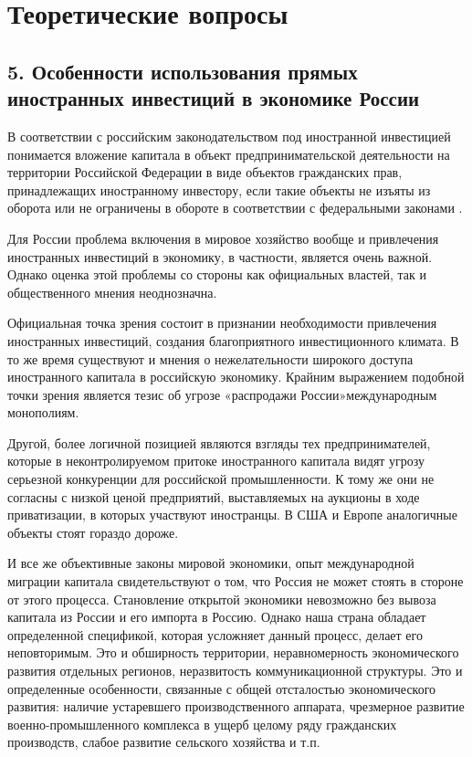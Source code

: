 \section{Теоретические вопросы}
\subsection*{5. Особенности использования прямых иностранных инвестиций в экономике России}

В соответствии с российским законодательством под иностранной инвестицией понимается вложение капитала в объект предпринимательской деятельности на территории Российской Федерации в виде объектов гражданских прав, принадлежащих иностранному инвестору, если такие объекты не изъяты из оборота или не ограничены в обороте в соответствии с федеральными законами .

Для России проблема включения в мировое хозяйство вообще и привлечения иностранных инвестиций в экономику, в частности, является очень важной. Однако оценка этой проблемы со стороны как официальных властей, так и общественного мнения неоднозначна.

Официальная точка зрения состоит в признании необходимости привлечения иностранных инвестиций, создания благоприятного инвестиционного климата. В то же время существуют и мнения о нежелательности широкого доступа иностранного капитала в российскую экономику. Крайним выражением подобной точки зрения является тезис об угрозе «распродажи России»международным монополиям.

Другой, более логичной позицией являются взгляды тех предпринимателей, которые в неконтролируемом притоке иностранного капитала видят угрозу серьезной конкуренции для российской промышленности. К тому же они не согласны с низкой ценой предприятий, выставляемых на аукционы в ходе приватизации, в которых участвуют иностранцы. В США и Европе аналогичные объекты стоят гораздо дороже.

И все же объективные законы мировой экономики, опыт международной миграции капитала свидетельствуют о том, что Россия не может стоять в стороне от этого процесса. Становление открытой экономики невозможно без вывоза капитала из России и его импорта в Россию. Однако наша страна обладает определенной спецификой, которая усложняет данный процесс, делает его неповторимым. Это и обширность территории, неравномерность экономического развития отдельных регионов, неразвитость коммуникационной структуры. Это и определенные особенности, связанные с общей отсталостью экономического развития: наличие устаревшего производственного аппарата, чрезмерное развитие военно-промышленного комплекса в ущерб целому ряду гражданских производств, слабое развитие сельского хозяйства и т.п.

